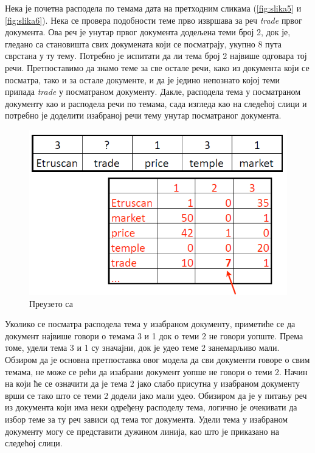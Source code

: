 Нека је почетна расподела по темама дата на претходним сликама (\ref{fig:slika5} и \ref{fig:slika6}). Нека се провера подобности теме прво извршава за реч \textit{trade} првог документа. Ова реч је унутар првог документа додељена теми број 2, док је, гледано са становишта свих докумената који се посматрају, укупно 8 пута сврстана у ту тему. Потребно је испитати да ли тема број 2 највише одговара тој речи.
Претпоставимо да знамо теме за све остале речи, како из документа који се посматра, тако и за остале документе, и да је једино непознато којој теми припада \textit{trade} у посматраном документу.
Дакле, расподела тема у посматраном документу као и расподела речи по темама, сада изгледа као на следећој слици %
и потребно је доделити изабраној речи тему унутар посматраног документа.

\begin{figure}[H]
    \centering
   \includegraphics[scale=0.6]{./Slike/slika7.png} 
	\caption{Преузето са \cite{mimno1}}
	\label{fig:slika7}
\end{figure}

Уколико се посматра расподела тема у изабраном документу, приметиће се да документ највише говори о темама 3 и 1 док о теми 2 не говори уопште. Према томе, удели тема 3 и 1 су значајни, док је удео теме 2 занемарљиво мали. Обзиром да је основна претпоставка овог модела да сви документи говоре о свим темама, не може се рећи да изабрани документ уопше не говори о теми 2. Начин на који ће се означити да је тема 2 јако слабо присутна у изабраном документу врши се тако што се теми 2 додели јако мали удео. Обизиром да је у питању реч из документа који има неки одређену расподелу тема, логично је очекивати да избор теме за ту реч зависи од тема тог документа. Удели тема у изабраном документу могу се представити дужином линија, као што је приказано на следећој слици. %

